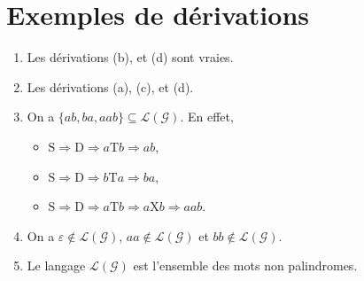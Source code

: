 \section{Exemples de dérivations}

\begin{enumerate}
	\item Les dérivations (b), et (d) sont vraies.
	\item Les dérivations (a), (c), et (d).
	\item On a $\{ab,ba,aab\} \subseteq \mathcal{L}(\mathcal{G})$. En effet,
		\begin{itemize}
			\item $\mathrm{S} \Rightarrow \mathrm{D} \Rightarrow a \mathrm{T} b \Rightarrow ab$,
			\item $\mathrm{S} \Rightarrow \mathrm{D} \Rightarrow b \mathrm{T} a \Rightarrow ba$,
			\item $\mathrm{S} \Rightarrow \mathrm{D} \Rightarrow a \mathrm{T} b \Rightarrow a \mathrm{X} b \Rightarrow aab$.
		\end{itemize}
	\item On a $\varepsilon \not\in \mathcal{L}(\mathcal{G})$, $aa \not\in \mathcal{L}(\mathcal{G})$ et $bb \not\in \mathcal{L}(\mathcal{G})$.
	\item Le langage $\mathcal{L}(\mathcal{G})$ est l'ensemble des mots non palindromes.
\end{enumerate}
